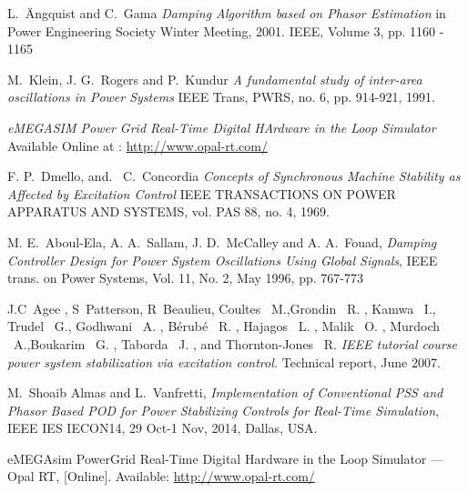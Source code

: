 \documentclass[journal]{IEEEtran}
\begin{document}
%
%
%
\begin{thebibliography}{1}

L.~\"{A}ngquist and C.~Gama  \emph{Damping Algorithm based on Phasor Estimation} in Power Engineering Society Winter Meeting, 2001. IEEE, Volume 3, pp. 1160 - 1165  

M.~Klein, J. G.~Rogers and P.~Kundur \emph{A fundamental study of inter-area oscillations in Power Systems} IEEE Trans, PWRS, no. 6, pp. 914-921, 1991. 

 \emph{eMEGASIM Power Grid Real-Time Digital HArdware in the Loop Simulator} Available Online at : \url{http://www.opal-rt.com/}

 F. P.~Dmello, and. \ C.~Concordia
  \emph{Concepts of Synchronous Machine Stability as Affected by Excitation Control} IEEE TRANSACTIONS ON POWER APPARATUS AND SYSTEMS, vol. PAS 88, no. 4, 1969. 
  
  M. E.~Aboul-Ela, A. A.~Sallam, J. D.~McCalley and A. A.~Fouad, \emph{Damping Controller Design for Power System Oscillations Using Global Signals}, IEEE trans. on Power Systems, Vol. 11, No. 2, May 1996, pp. 767-773

 J.C~Agee , S~Patterson, R~Beaulieu, Coultes \ M.,Grondin \ R. , Kamwa \ I.,
Trudel \ G., Godhwani \ A. , Bérubé \ R. , Hajagos \ L. , Malik \ O. , Murdoch \ A.,Boukarim \ G. , Taborda \ J. , and Thornton-Jones \ R. \emph{IEEE tutorial course
power system stabilization via excitation control.} Technical report, June
2007.
  
 M.~Shoaib Almas and L.~Vanfretti, \emph{Implementation of Conventional PSS and Phasor Based POD for Power Stabilizing Controls for Real-Time Simulation}, IEEE IES IECON14, 29 Oct-1 Nov, 2014, Dallas, USA.

 eMEGAsim PowerGrid Real-Time Digital Hardware in the Loop Simulator — Opal RT, [Online]. Available: \url{http://www.opal-rt.com/}


\end{thebibliography}
\end{document}
